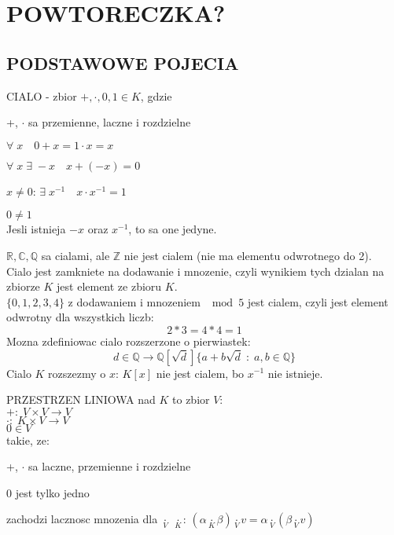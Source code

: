 \documentclass{article}
\newcommand{\R}{\mathbb{R}}
\newcommand{\Q}{\mathbb{Q}}
\newcommand{\Z}{\mathbb{Z}}
\newcommand{\C}{\mathbb{C}}
\begin{document}
\pagecolor{back}\color{txt}\ttfamily
\section*{POWTORECZKA?}
\subsection*{PODSTAWOWE POJECIA}
    \begin{center}
    \color{def}CIALO \color{txt}- zbior $+, \cdot, 0, 1\in K$, gdzie\smallskip\par
        +, $\cdot$ sa przemienne, laczne i rozdzielne\smallskip\par
        $\forall\;x\quad0+x=1\cdot x=x$\smallskip\par
        $\forall\;x\;\exists\;-x\quad x+(-x)=0$\smallskip\par
        $x\neq0$: $\exists\;x^{-1}\quad x\cdot x^{-1}=1$\smallskip\par
        $0\neq1$\medskip\\
    \color{emp}Jesli istnieja $-x$ oraz $x^{-1}$, to sa one jedyne.\color{txt}\medskip\\
    \end{center}
    $\R,\C,\Q$ sa cialami, ale $\Z$ nie jest cialem (nie ma elementu odwrotnego do 2).\smallskip\\
    Cialo jest \color{acc}zamkniete na dodawanie i mnozenie\color{txt}, czyli wynikiem tych dzialan na zbiorze $K$ jest element ze zbioru $K$.\medskip\\
    $\{0, 1, 2, 3, 4\}$ z dodawaniem i mnozeniem $\mod5$ jest cialem, czyli jest element odwrotny dla wszystkich liczb:
    $$2*3=4*4=1$$
    Mozna zdefiniowac cialo rozszerzone o pierwiastek:
    $$d\in\Q\to\Q[\sqrt{d}]\{a+b\sqrt{d}\;:\;a,b\in\Q\}$$
    Cialo $K$ rozszezmy o $x$: $K[x]$ nie jest cialem, bo $x^{-1}$ nie istnieje.
    \begin{center}\color{def}PRZESTRZEN LINIOWA \color{txt}nad $K$ to zbior $V$:\\
        $+:\;V\times V\to V$\\
        $\cdot:\;K\times V\to V$\\
        $0\in V$\smallskip\\
        takie, ze:\smallskip\par
        +, $\cdot$ sa laczne, przemienne i rozdzielne\smallskip\par
        0 jest tylko jedno\smallskip\par
        zachodzi lacznosc mnozenia dla $\underset{V}{\cdot}$ $\underset{K}{\cdot}$: $(\alpha\underset{K}{\cdot}\beta)\underset{V}{\cdot}v=\alpha\underset{V}{\cdot}(\beta\underset{V}{\cdot}v)$\smallskip\\
    \end{center}
\end{document}
